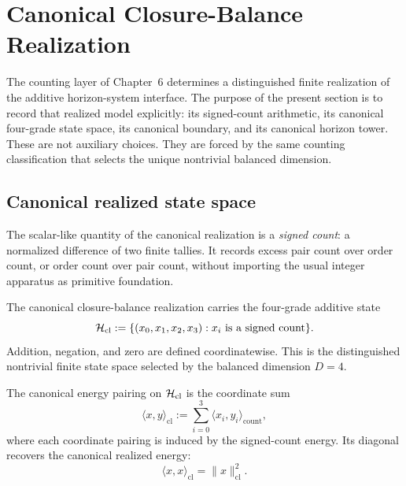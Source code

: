 \section{Canonical Closure-Balance Realization}
\label{sec:closure-balance-realization}

The counting layer of Chapter~6 determines a distinguished finite realization
of the additive horizon-system interface. The purpose of the present section is
to record that realized model explicitly: its signed-count arithmetic, its
canonical four-grade state space, its canonical boundary, and its canonical
horizon tower. These are not auxiliary choices. They are forced by the same
counting classification that selects the unique nontrivial balanced dimension.

\subsection{Canonical realized state space}

\begin{definition}\label{def:scalar-field}
The scalar-like quantity of the canonical realization is a \emph{signed count}:
a normalized difference of two finite tallies. It records excess pair count
over order count, or order count over pair count, without importing the usual
integer apparatus as primitive foundation.
\end{definition}

\begin{definition}
\label{def:closure-realized-state}
The canonical closure-balance realization carries the four-grade additive state
\[
\mathcal{H}_{\mathrm{cl}} := \{(x_0,x_1,x_2,x_3) : x_i \text{ is a signed count}\}.
\]
Addition, negation, and zero are defined coordinatewise. This is the
distinguished nontrivial finite state space selected by the balanced dimension
$D=4$.
\end{definition}

\begin{definition}
\label{def:closure-realized-pairing}
The canonical energy pairing on $\mathcal{H}_{\mathrm{cl}}$ is the coordinate sum
\[
\langle x,y\rangle_{\mathrm{cl}}
:=
\sum_{i=0}^3 \langle x_i,y_i\rangle_{\mathrm{count}},
\]
where each coordinate pairing is induced by the signed-count energy. Its
diagonal recovers the canonical realized energy:
\[
\langle x,x\rangle_{\mathrm{cl}} = \|x\|_{\mathrm{cl}}^2.
\]
\end{definition}

